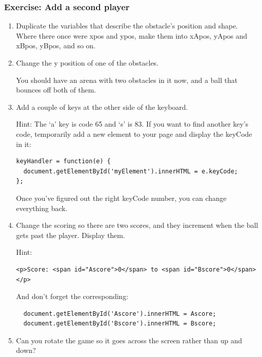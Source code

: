 \documentclass[11pt]{article}
\begin{document}
\subsubsection{Exercise: Add a second player}


\begin{enumerate}

\item Duplicate the variables that describe the obstacle's position
  and shape.  Where there once were xpos and ypos, make them into
  xApos, yApos and xBpos, yBpos, and so on.

\item Change the y position of one of the obstacles.

  You should have an arena with two obstacles in it now, and a ball
  that bounces off both of them.

\item Add a couple of keys at the other side of the keyboard.

  Hint: The `a' key is code 65 and `s' is 83.  If you want to find
  another key's code, temporarily add a new element to your page and
  display the keyCode in it:

\begin{verbatim}
keyHandler = function(e) {
  document.getElementById('myElement').innerHTML = e.keyCode;
};
\end{verbatim}

Once you've figured out the right keyCode number, you can change
everything back.

\item Change the scoring so there are two scores, and they increment
  when the ball gets past the player.  Display them.

Hint:

\begin{verbatim}
<p>Score: <span id="Ascore">0</span> to <span id="Bscore">0</span></p>
\end{verbatim}

And don't forget the corresponding:

\begin{verbatim}
  document.getElementById('Ascore').innerHTML = Ascore;
  document.getElementById('Bscore').innerHTML = Bscore;
\end{verbatim}


\item Can you rotate the game so it goes across the screen rather than
  up and down?


\end{enumerate}
\end{document}
